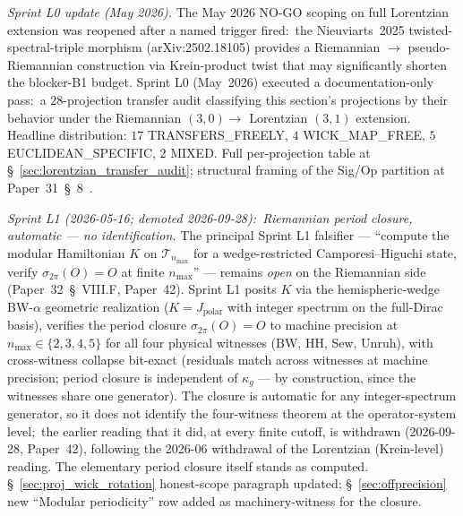 \documentclass[11pt]{article}
\begin{document}
\begin{enumerate}
\medskip
\noindent\textit{Sprint L0 update (May 2026).}  The May 2026 NO-GO
scoping on full Lorentzian extension was reopened after a named
trigger
fired:\ the Nieuviarts~2025 twisted-spectral-triple morphism
(arXiv:2502.18105) provides a Riemannian $\to$ pseudo-Riemannian
construction via Krein-product twist that may significantly shorten
the blocker-B1 budget.  Sprint L0
(May~2026) executed a
documentation-only pass:\ a 28-projection transfer audit classifying
this section's projections by their behavior under the
Riemannian $(3, 0) \to$ Lorentzian $(3, 1)$ extension.  Headline
distribution: $17$ TRANSFERS\_FREELY, $4$ WICK\_MAP\_FREE,
$5$ EUCLIDEAN\_SPECIFIC, $2$ MIXED.  Full per-projection table at
\S~\ref{sec:lorentzian_transfer_audit}; structural framing of the
Sig/Op partition at Paper~31~\S~8~\cite{paper31}.

\medskip
\noindent\textit{Sprint L1 (2026-05-16; demoted 2026-09-28):\
Riemannian period closure, automatic --- no identification.}  The
principal Sprint L1
falsifier --- ``compute the modular Hamiltonian $K$ on
$\mathcal{T}_{n_{\max}}$ for a wedge-restricted Camporesi--Higuchi
state, verify $\sigma_{2\pi}(O) = O$ at finite $n_{\max}$'' ---
remains \emph{open} on the Riemannian side
(Paper~32~\S~VIII.F, Paper~42).  Sprint L1 posits $K$ via the
hemispheric-wedge BW-$\alpha$ geometric realization
($K = J_{\mathrm{polar}}$ with integer spectrum on the full-Dirac
basis), verifies the period closure $\sigma_{2\pi}(O) = O$ to machine
precision at $n_{\max} \in \{2, 3, 4, 5\}$ for all four physical witnesses (BW,
HH, Sew, Unruh), with cross-witness collapse bit-exact (residuals
match across witnesses at machine precision; period closure is
independent of $\kappa_g$ --- by construction, since the witnesses
share one generator).  The closure is automatic for any
integer-spectrum generator, so it does not identify the four-witness
theorem at the operator-system level;\ the earlier reading that it
did, at every finite cutoff, is withdrawn (2026-09-28, Paper~42),
following the 2026-06 withdrawal of the Lorentzian (Krein-level)
reading.  The elementary period closure itself stands as computed.
\S~\ref{sec:proj_wick_rotation} honest-scope paragraph updated;
\S~\ref{sec:offprecision} new ``Modular periodicity'' row added as
machinery-witness for the closure.


\end{enumerate}
\end{document}
